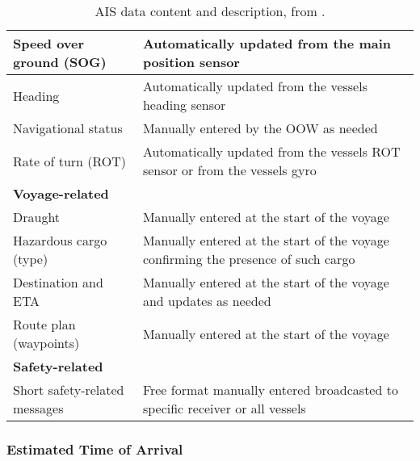 \documentclass[../main.tex]{subfiles}
\begin{document}
\begin{table}[H]
\begin{tabular}{|m{5cm}|m{9cm}|}
\rowcolor[HTML]{EFEFEF} 
Speed over ground (SOG)                                      & Automatically updated from the main position sensor                               \\ \hline
Heading                                                      & Automatically updated from the vessels heading sensor                             \\ \hline
\rowcolor[HTML]{EFEFEF} 
Navigational status                                          & Manually entered by the OOW as needed                                             \\ \hline
Rate of turn (ROT)                                           & Automatically updated from the vessels ROT sensor or from the vessels gyro        \\ \hline
\rowcolor[HTML]{C0C0C0} 
\textbf{Voyage-related}                                      &                                                                                   \\ \hline
Draught                                                      & Manually entered at the start of the voyage                                       \\ \hline
\rowcolor[HTML]{EFEFEF} 
Hazardous cargo (type)                                       & Manually entered at the start of the voyage confirming the presence of such cargo \\ \hline
Destination and ETA                                          & Manually entered at the start of the voyage and updates as needed                 \\ \hline
\rowcolor[HTML]{EFEFEF} 
Route plan (waypoints)                                       & Manually entered at the start of the voyage                                       \\ \hline
\rowcolor[HTML]{C0C0C0} 
\textbf{Safety-related}                                      &                                                                                   \\ \hline
Short safety-related messages                                & Free format manually entered broadcasted to specific receiver or all vessels      \\ \hline
\end{tabular}
\caption{AIS data content and description, from \cite{IMO_2015}.}
\label{tab:ais-data}
\end{table}

\subsubsection{Estimated Time of Arrival}
\end{document}
